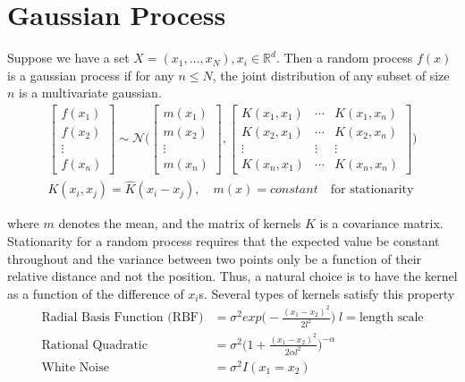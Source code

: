 \documentclass[../../statistical_learning_notes.tex]{subfiles}
\begin{document}
\section{Gaussian Process}
Suppose we have a set $X = (x_{1}, \ldots, x_{N}), x_{i} \in \mathbb{R}^{d}$. Then a random process $f(x)$ is a gaussian process if for any $n \leq N$, the joint distribution of any subset of size $n$ is a multivariate gaussian.
\begin{align*}
    \begin{bmatrix} f(x_{1})\\ f(x_{2})\\ \vdots\\ f(x_{n}) \end{bmatrix} \sim \mathcal{N} \bigg( \begin{bmatrix} m(x_{1})\\ m(x_{2})\\ \vdots\\ m(x_{n}) \end{bmatrix}, \begin{bmatrix} K(x_{1}, x_{1}) &\cdots &K(x_{1}, x_{n})\\ K(x_{2}, x_{1}) &\cdots &K(x_{2}, x_{n})\\ \vdots &\vdots &\vdots\\ K(x_{n}, x_{1}) &\cdots &K(x_{n}, x_{n}) \end{bmatrix}  \bigg)\\
    K(x_{i}, x_{j}) = \hat{K}(x_{i} - x_{j}), \quad m(x) = constant \quad \text{for stationarity}
\end{align*}

where $m$ denotes the mean, and the matrix of kernels $K$ is a covariance matrix. Stationarity for a random process requires that the expected value be constant throughout and the variance between two points only be a function of their relative distance and not the position. Thus, a natural choice is to have the kernel as a function of the difference of $x_{i}$s. Several types of kernels satisfy this property
\begin{align*}
    \text{Radial Basis Function (RBF)} &= \sigma^{2}exp \bigg( -\frac{(x_{1} - x_{2})^{2}}{2l^{2}} \bigg) \; l = \text{length scale}\\
    \text{Rational Quadratic} &= \sigma^{2}\bigg(1 +\frac{(x_{1} - x_{2})^{2}}{2\alpha l^{2}} \bigg)^{-\alpha}\\
    \text{White Noise} &= \sigma^{2}I(x_{1} = x_{2})
\end{align*}
\end{document}
